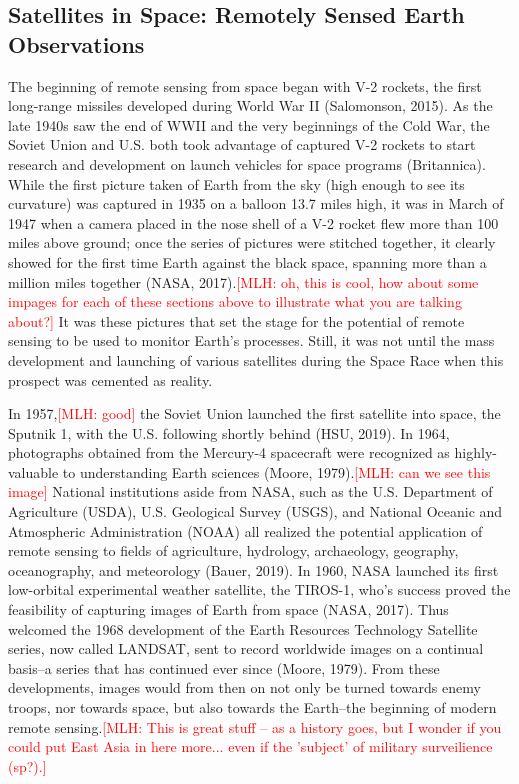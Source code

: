 \documentclass{book}\usepackage{knitr}
\newcommand{\red}[1]{\textcolor{red}{[MLH: #1]}}
\begin{document}
\begin{knitrout}
\begin{kframe}
\subsection{Satellites in Space: Remotely Sensed Earth Observations}

The beginning of remote sensing from space began with V-2 rockets, the first long-range missiles developed during World War II (Salomonson, 2015). As the late 1940s saw the end of WWII and the very beginnings of the Cold War, the Soviet Union and U.S. both took advantage of captured V-2 rockets to start research and development on launch vehicles for space programs (Britannica). While the first picture taken of Earth from the sky (high enough to see its curvature) was captured in 1935 on a balloon 13.7 miles high, it was in March of 1947 when a camera placed in the nose shell of a V-2 rocket flew more than 100 miles above ground; once the series of pictures were stitched together, it clearly showed for the first time Earth against the black space, spanning more than a million miles together (NASA, 2017).\red{oh, this is cool, how about some impages for each of these sections above to illustrate what you are talking about?} It was these pictures that set the stage for the potential of remote sensing to be used to monitor Earth’s processes. Still, it was not until the mass development and launching of various satellites during the Space Race when this prospect was cemented as reality.

In 1957,\red{good} the Soviet Union launched the first satellite into space, the Sputnik 1, with the U.S. following shortly behind (HSU, 2019). In 1964, photographs obtained from the Mercury-4 spacecraft were recognized as highly-valuable to understanding Earth sciences (Moore, 1979).\red{can we see this image} National institutions aside from NASA, such as the U.S. Department of Agriculture (USDA), U.S. Geological Survey (USGS), and National Oceanic and Atmospheric Administration (NOAA) all realized the potential application of remote sensing to fields of agriculture, hydrology, archaeology, geography, oceanography, and meteorology (Bauer, 2019). In 1960, NASA launched its first low-orbital experimental weather satellite, the TIROS-1, who’s success proved the feasibility of capturing images of Earth from space (NASA, 2017). Thus welcomed the 1968 development of the Earth Resources Technology Satellite series, now called LANDSAT, sent to record worldwide images on a continual basis--a series that has continued ever since (Moore, 1979). From these developments, images would from then on not only be turned towards enemy troops, nor towards space, but also towards the Earth--the beginning of modern remote sensing.\red{This is great stuff -- as a history goes, but I wonder if you could put East Asia in here more... even if the 'subject' of military surveilience (sp?).}


\end{kframe}
\end{knitrout}
\end{document}
